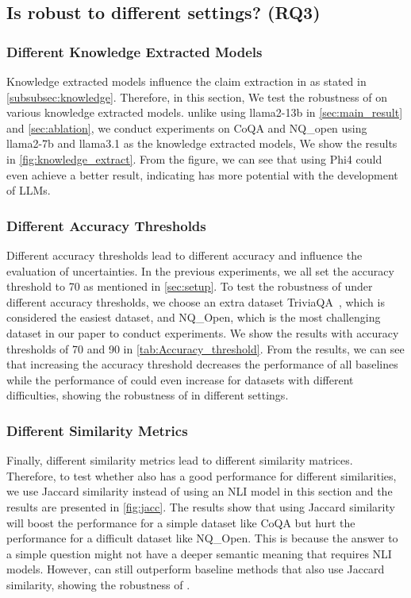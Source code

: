 \subsection{Is \ours robust to different settings? (RQ3)}
\subsubsection{Different Knowledge Extracted Models} Knowledge extracted models influence the claim extraction in \ours as stated in \cref{subsubsec:knowledge}. Therefore, in this section, We test the robustness of \ours on various knowledge extracted models. unlike using llama2-13b in \cref{sec:main_result} and \cref{sec:ablation}, we conduct experiments on CoQA and NQ\_open using llama2-7b and llama3.1 as the knowledge extracted models, We show the results in \cref{fig:knowledge_extract}. From the figure, we can see that using Phi4 could even achieve a better result, indicating \ours has more potential with the development of LLMs. 

\subsubsection{Different Accuracy Thresholds} Different accuracy thresholds lead to different accuracy and influence the evaluation of uncertainties. In the previous experiments, we all set the accuracy threshold to 70 as mentioned in \cref{sec:setup}.  To test the robustness of \ours under different accuracy thresholds, we choose an extra dataset TriviaQA~\cite{joshi2017triviaqa}, which is considered the easiest dataset, and NQ\_Open, which is the most challenging dataset in our paper to conduct experiments. We show the results with accuracy thresholds of 70 and 90 in \cref{tab:Accuracy_threshold}. From the results, we can see that increasing the accuracy threshold decreases the performance of all baselines while the performance of \ours could even increase for datasets with different difficulties, showing the robustness of \ours in different settings. 

\subsubsection{Different Similarity Metrics} Finally, different similarity metrics lead to different similarity matrices. Therefore, to test whether \ours also has a good performance for different similarities, we use Jaccard similarity instead of using an NLI model in this section and the results are presented in \cref{fig:jacc}. The results show that using Jaccard similarity will boost the performance for a simple dataset like CoQA but hurt the performance for a difficult dataset like NQ\_Open. This is because the answer to a simple question might not have a deeper semantic meaning that requires NLI models. However, \ours can still outperform baseline methods that also use Jaccard similarity, showing the robustness of \ours.





